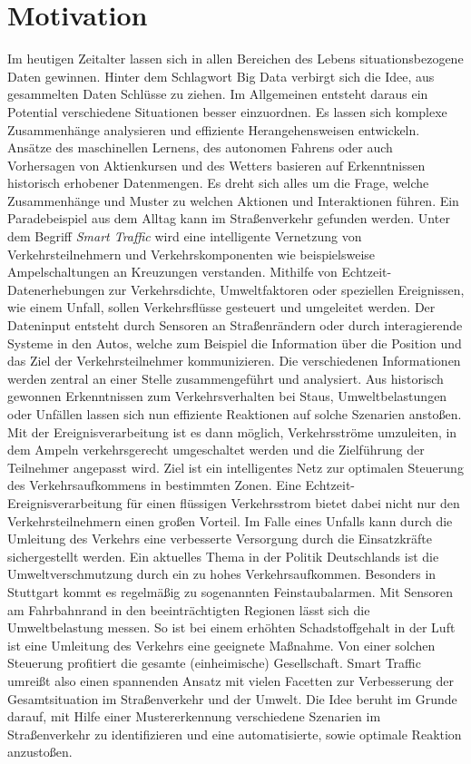 \section{Motivation}

Im heutigen Zeitalter lassen sich in allen Bereichen des Lebens situationsbezogene Daten gewinnen. Hinter dem Schlagwort Big Data verbirgt sich die Idee, aus gesammelten Daten Schlüsse zu ziehen. Im Allgemeinen entsteht daraus ein Potential verschiedene Situationen  besser einzuordnen. Es lassen sich komplexe Zusammenhänge analysieren und effiziente Herangehensweisen entwickeln. Ansätze des maschinellen Lernens, des autonomen Fahrens oder auch Vorhersagen von Aktienkursen und des Wetters basieren auf Erkenntnissen historisch erhobener Datenmengen. Es dreht sich alles um die Frage, welche Zusammenhänge und Muster zu welchen Aktionen und Interaktionen führen.
Ein Paradebeispiel aus dem Alltag kann im Straßenverkehr gefunden werden. Unter dem Begriff \emph{Smart Traffic} wird eine intelligente Vernetzung von Verkehrsteilnehmern und Verkehrskomponenten wie beispielsweise Ampelschaltungen an Kreuzungen verstanden. Mithilfe von Echtzeit-Datenerhebungen zur Verkehrsdichte, Umweltfaktoren oder speziellen Ereignissen, wie einem Unfall, sollen Verkehrsflüsse gesteuert und umgeleitet werden. Der Dateninput entsteht durch Sensoren an Straßenrändern oder durch interagierende Systeme in den Autos, welche zum Beispiel die Information über die Position und das Ziel der Verkehrsteilnehmer kommunizieren. Die verschiedenen Informationen werden zentral an einer Stelle zusammengeführt und analysiert. Aus historisch gewonnen Erkenntnissen zum Verkehrsverhalten bei Staus, Umweltbelastungen oder Unfällen lassen sich nun effiziente Reaktionen auf solche Szenarien anstoßen.  Mit der Ereignisverarbeitung ist es dann möglich, Verkehrsströme umzuleiten, in dem Ampeln verkehrsgerecht umgeschaltet werden und die Zielführung der Teilnehmer angepasst wird. Ziel ist ein intelligentes Netz zur optimalen Steuerung des Verkehrsaufkommens in bestimmten Zonen. Eine Echtzeit-Ereignisverarbeitung für einen flüssigen Verkehrsstrom bietet dabei nicht nur den Verkehrsteilnehmern einen großen Vorteil. Im Falle eines Unfalls kann durch die Umleitung des Verkehrs eine verbesserte Versorgung durch die Einsatzkräfte sichergestellt werden. Ein aktuelles Thema in der Politik Deutschlands ist die Umweltverschmutzung durch ein zu hohes Verkehrsaufkommen. Besonders in Stuttgart kommt es regelmäßig zu sogenannten Feinstaubalarmen. Mit Sensoren am Fahrbahnrand in den beeinträchtigten Regionen lässt sich die Umweltbelastung messen. So ist bei einem erhöhten Schadstoffgehalt in der Luft ist eine Umleitung des Verkehrs eine geeignete Maßnahme. Von einer solchen Steuerung profitiert die gesamte (einheimische) Gesellschaft. 
Smart Traffic umreißt also einen spannenden Ansatz mit vielen Facetten zur Verbesserung der Gesamtsituation im Straßenverkehr und der Umwelt. Die Idee beruht im Grunde darauf, mit Hilfe einer Mustererkennung verschiedene Szenarien im Straßenverkehr zu identifizieren und eine automatisierte, sowie optimale Reaktion anzustoßen.\\

